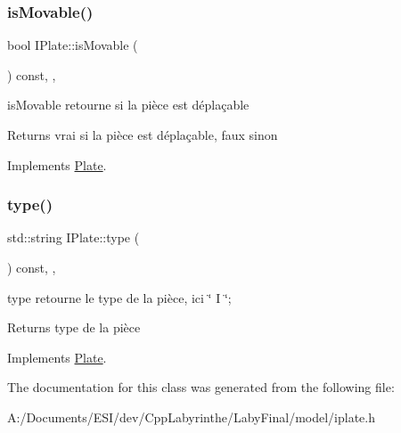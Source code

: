 \subsubsection{\texorpdfstring{isMovable()}{isMovable()}}
{\footnotesize\ttfamily bool I\+Plate\+::is\+Movable (\begin{DoxyParamCaption}{ }\end{DoxyParamCaption}) const\hspace{0.3cm}{\ttfamily [inline]}, {\ttfamily [override]}, {\ttfamily [virtual]}}



is\+Movable retourne si la pièce est déplaçable 

\begin{DoxyReturn}{Returns}
vrai si la pièce est déplaçable, faux sinon 
\end{DoxyReturn}


Implements \mbox{\hyperlink{class_plate}{Plate}}.

\mbox{\label{class_i_plate_ace93dd5814447d91b8241d2713dfe453}} 
\subsubsection{\texorpdfstring{type()}{type()}}
{\footnotesize\ttfamily std\+::string I\+Plate\+::type (\begin{DoxyParamCaption}{ }\end{DoxyParamCaption}) const\hspace{0.3cm}{\ttfamily [inline]}, {\ttfamily [override]}, {\ttfamily [virtual]}}



type retourne le type de la pièce, ici \char`\"{} I \char`\"{}; 

\begin{DoxyReturn}{Returns}
type de la pièce 
\end{DoxyReturn}


Implements \mbox{\hyperlink{class_plate}{Plate}}.



The documentation for this class was generated from the following file\+:\begin{DoxyCompactItemize}
\item 
A\+:/\+Documents/\+E\+S\+I/dev/\+Cpp\+Labyrinthe/\+Laby\+Final/model/iplate.\+h\end{DoxyCompactItemize}
